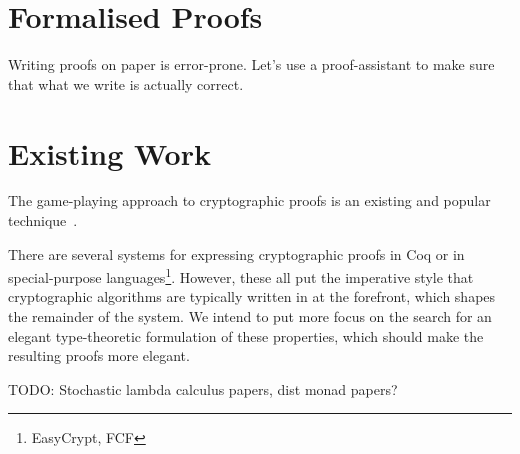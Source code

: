 \section{Formalised Proofs}

Writing proofs on paper is error-prone.  Let's use a proof-assistant to make sure that what we write is actually
correct.

\section{Existing Work}

The game-playing approach to cryptographic proofs is an existing and popular technique~\cite{codebasedgames}.

There are several systems for expressing cryptographic proofs in Coq or in special-purpose
languages\footnote{EasyCrypt, FCF}.  However, these all put the imperative style that cryptographic algorithms are
typically written in at the forefront, which shapes the remainder of the system.  We intend to put more focus on the
search for an elegant type-theoretic formulation of these properties, which should make the resulting proofs more
elegant.

TODO: Stochastic lambda calculus papers, dist monad papers?
